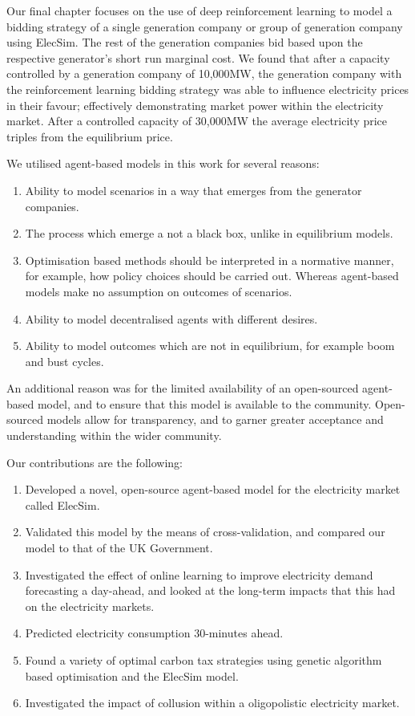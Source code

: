 Our final chapter focuses on the use of deep reinforcement learning to model a bidding strategy of a single generation company or group of generation company using ElecSim. The rest of the generation companies bid based upon the respective generator's short run marginal cost. We found that after a capacity controlled by a generation company of 10,000MW, the generation company with the reinforcement learning bidding strategy was able to influence electricity prices in their favour; effectively demonstrating market power within the electricity market. After a controlled capacity of 30,000MW the average electricity price triples from the equilibrium price. 

We utilised agent-based models in this work for several reasons:
\begin{enumerate}
	\item Ability to model scenarios in a way that emerges from the generator companies.
	\item The process which emerge a not a black box, unlike in equilibrium models.
	\item Optimisation based methods should be interpreted in a normative manner, for example, how policy choices should be carried out. Whereas agent-based models make no assumption on outcomes of scenarios.
	\item Ability to model decentralised agents with different desires.
	\item Ability to model outcomes which are not in equilibrium, for example boom and bust cycles.
\end{enumerate}

An additional reason was for the limited availability of an open-sourced agent-based model, and to ensure that this model is available to the community. Open-sourced models allow for transparency, and to garner greater acceptance and understanding within the wider community. 

Our contributions are the following:

\begin{enumerate}
	\item Developed a novel, open-source agent-based model for the electricity market called ElecSim.
	\item Validated this model by the means of cross-validation, and compared our model to that of the UK Government.
	\item Investigated the effect of online learning to improve electricity demand forecasting a day-ahead, and looked at the long-term impacts that this had on the electricity markets.
	\item Predicted electricity consumption 30-minutes ahead.
	\item Found a variety of optimal carbon tax strategies using genetic algorithm based optimisation and the ElecSim model.
	\item Investigated the impact of collusion within a oligopolistic electricity market.
\end{enumerate}


